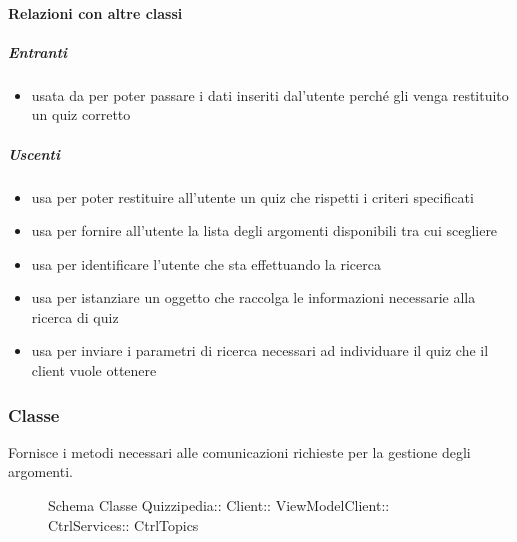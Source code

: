 \paragraph{Relazioni con altre classi}
\subparagraph{Entranti}
\begin{itemize}
\item usata da  per poter passare i dati inseriti dal'utente perché gli venga restituito un quiz corretto
\end{itemize}
\subparagraph{Uscenti}
\begin{itemize}
\item usa  per poter restituire all'utente un quiz che rispetti i criteri specificati
\item usa  per fornire all'utente la lista degli argomenti disponibili tra cui scegliere
\item usa  per identificare l'utente che sta effettuando la ricerca
\item usa  per istanziare un oggetto che raccolga le informazioni necessarie alla ricerca di quiz
\item usa  per inviare i parametri di ricerca necessari ad individuare il quiz che il client vuole ottenere
\end{itemize}
\subsubsection{Classe }
Fornisce i metodi necessari alle comunicazioni richieste per la gestione degli argomenti.
\begin{figure}[H]
\centering
\noindent{}
\caption[Schema Classe CtrlTopics]{Schema Classe Quizzipedia:: Client:: ViewModelClient:: CtrlServices:: CtrlTopics}
\end{figure}
